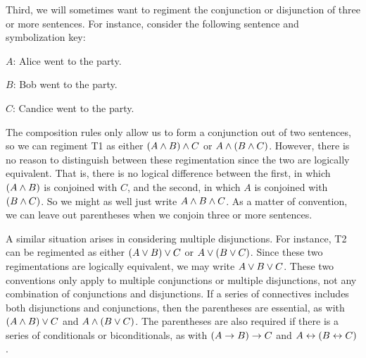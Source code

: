 Third, we will sometimes want to regiment the conjunction or disjunction of three or more sentences.
For instance, consider the following sentence and symbolization key: 

\begin{earg}
\end{earg}

\begin{ekey}
  \item[$A$:] Alice went to the party.
  \item[$B$:] Bob went to the party.
  \item[$C$:] Candice went to the party.
\end{ekey}

The composition rules only allow us to form a conjunction out of two sentences, so we can regiment T1 as either $(A \wedge B) \wedge C$ or $A \wedge (B \wedge C)$.
However, there is no reason to distinguish between these regimentation since the two are logically equivalent.
That is, there is no logical difference between the first, in which $(A \wedge B)$ is conjoined with $C$, and the second, in which $A$ is conjoined with $(B \wedge C)$.
So we might as well just write $A \wedge B \wedge C$.
As a matter of convention, we can leave out parentheses when we conjoin three or more sentences.

A similar situation arises in considering multiple disjunctions.
For instance, T2 can be regimented as either $(A \vee B) \vee C$ or $A \vee (B \vee C)$.
Since these two regimentations are logically equivalent, we may write $A \vee B \vee C$.
These two conventions only apply to multiple conjunctions or multiple disjunctions, not any combination of conjunctions and disjunctions.
If a series of connectives includes both disjunctions and conjunctions, then the parentheses are essential, as with $(A \wedge B) \vee C$ and $A \wedge (B \vee C)$.
The parentheses are also required if there is a series of conditionals or biconditionals, as with $(A \rightarrow B) \rightarrow C$ and $A \leftrightarrow (B \leftrightarrow C)$.

